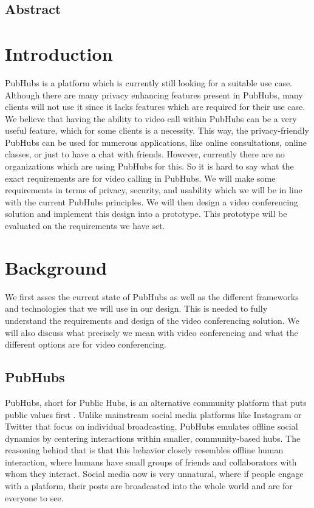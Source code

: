 \documentclass{report}
\begin{document}
\newpage
\section*{Abstract}


\chapter{Introduction}
PubHubs is a platform which is currently still looking for a suitable use case. Although there are many privacy enhancing features present in PubHubs, many clients will not use it since it lacks features which are required for their use case. We believe that having the ability to video call within PubHubs can be a very useful feature, which for some clients is a necessity.
This way, the privacy-friendly PubHubs can be used for numerous applications, like online consultations, online
classes, or just to have a chat with friends. However, currently there are no organizations which are using PubHubs for this. So it is hard to say what the exact requirements are
for video calling in PubHubs. We will make some requirements in terms of privacy, security, and usability which we
will be in line with the current PubHubs principles. We will then design a video conferencing solution and implement
this design into a prototype. This prototype will be evaluated on the requirements we have set.


\chapter{Background}
We first asses the current state of PubHubs as well as the different frameworks and technologies that we will use in
our design. This is needed to fully understand the requirements and design of the video conferencing solution. We
will also discuss what precisely we mean with video conferencing and what the different options are for video
conferencing.

\section{PubHubs}
PubHubs, short for Public Hubs, is an alternative community platform that puts public values first
\cite{jacobs_pubhubs_2023}. Unlike mainstream social media platforms like Instagram or Twitter that focus on
individual broadcasting, PubHubs emulates offline social dynamics by centering interactions within smaller,
community-based hubs. The reasoning
behind that is that this behavior closely resembles offline human interaction, where humans have small groups of
friends and collaborators with whom they interact. Social media now is very unnatural, where if people engage with a
platform, their posts are broadcasted into the whole world and are for everyone to see.
\end{document}
